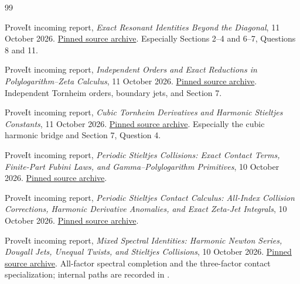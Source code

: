 \documentclass[11pt]{article}
\numberwithin{equation}{section}
\theoremstyle{definition}
\theoremstyle{remark}
\newcommand{\src}[1]{\texttt{\detokenize{#1}}}
\begin{document}
\begin{thebibliography}{99}
\small
\setlength{\itemsep}{3pt}
\setlength{\parskip}{0pt}

ProveIt incoming report,
\emph{Exact Resonant Identities Beyond the Diagonal}, 11 October 2026.
\href{https://github.com/VladimirReshetnikov/ProveIt/blob/c2cb285b64273e4cb2c8d7a03c68a4a99ac812d4/docs/incoming/ProveIt_Exact_Resonant_Identities_2026-10-11.zip}{Pinned source archive}.
Especially Sections 2--4 and 6--7, Questions 8 and 11.

ProveIt incoming report,
\emph{Independent Orders and Exact Reductions in Polylogarithm--Zeta
Calculus}, 11 October 2026.
\href{https://github.com/VladimirReshetnikov/ProveIt/blob/c2cb285b64273e4cb2c8d7a03c68a4a99ac812d4/docs/incoming/ProveIt_Independent_Orders_2026-10-11.zip}{Pinned source archive}.
Independent Tornheim orders, boundary jets, and Section 7.

ProveIt incoming report,
\emph{Cubic Tornheim Derivatives and Harmonic Stieltjes Constants},
11 October 2026.
\href{https://github.com/VladimirReshetnikov/ProveIt/blob/c2cb285b64273e4cb2c8d7a03c68a4a99ac812d4/docs/incoming/ProveIt_Cubic_Harmonic_Mixed_Orders_2026-10-11.zip}{Pinned source archive}.
Especially the cubic harmonic bridge and Section 7, Question 4.

ProveIt incoming report,
\emph{Periodic Stieltjes Collisions: Exact Contact Terms, Finite-Part
Fubini Laws, and Gamma--Polylogarithm Primitives}, 10 October 2026.
\href{https://github.com/VladimirReshetnikov/ProveIt/blob/c2cb285b64273e4cb2c8d7a03c68a4a99ac812d4/docs/incoming/ProveIt_Periodic_Collision_Contacts_2026-10-10.zip}{Pinned source archive}.

ProveIt incoming report,
\emph{Periodic Stieltjes Contact Calculus: All-Index Collision
Corrections, Harmonic Derivative Anomalies, and Exact Zeta-Jet
Integrals}, 10 October 2026.
\href{https://github.com/VladimirReshetnikov/ProveIt/blob/c2cb285b64273e4cb2c8d7a03c68a4a99ac812d4/docs/incoming/ProveIt_Periodic_Stieltjes_Contact_2026-10-10.zip}{Pinned source archive}.

ProveIt incoming report,
\emph{Mixed Spectral Identities: Harmonic Newton Series, Dougall Jets,
Unequal Twists, and Stieltjes Collisions}, 10 October 2026.
\href{https://github.com/VladimirReshetnikov/ProveIt/blob/c2cb285b64273e4cb2c8d7a03c68a4a99ac812d4/docs/incoming/ProveIt_Mixed_Spectral_Identities_2026-10-10.zip}{Pinned source archive}.
All-factor spectral completion and the three-factor contact
specialization; internal paths are recorded in \src{SOURCE_AUDIT.md}.


\end{thebibliography}
\end{document}
